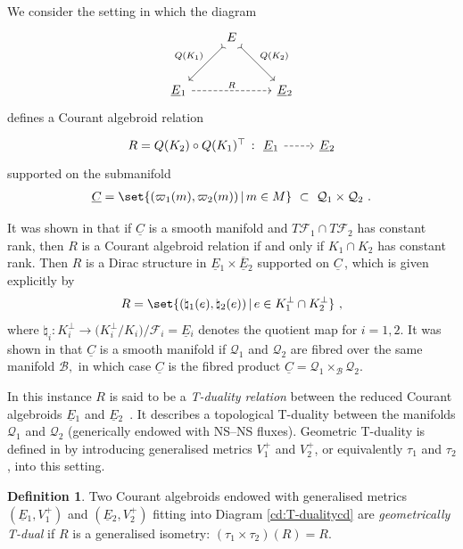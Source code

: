 \documentclass[a4paper, reqno, 11pt]{amsart}
\numberwithin{equation}{section}
\theoremstyle{definition}
\newtheorem{definition}[equation]{Definition}
\newcommand{\red}[1]{\underline{#1}}
\newcommand{\cB}{{\mathcal B}}
\newcommand{\cQ}{{\mathcal Q}}
\newcommand{\cF}{{\mathcal F}}
\theoremstyle{remark}
\begin{document}
We consider the setting in which the diagram
\begin{equation}
\begin{tikzcd}[row sep = 1cm] \label{cd:T-dualitycd}
  &\arrow[tail,swap]{dl}{Q(K_1)} E \arrow[tail]{dr}{Q(K_2)}&   \\
\red E{}_1 \arrow[dashed]{rr}{R}& & \red E{}_2 
 \end{tikzcd}
 \end{equation}
defines a  Courant algebroid relation 
\begin{equation}
\begin{tikzcd}
 R =  Q(K_2) \circ Q(K_1)^\top \ \colon \ \red E{}_1 \ar[r,dashed] & \red E{}_2 
 \end{tikzcd}
\end{equation} 
supported on the submanifold 
\begin{align}
    {\red C}=\set{(\varpi_1(m),\varpi_2(m)) \, | \, m \in M} \ \subset \ \cQ_1 \times \cQ_2 \ .
\end{align}

It was shown in \cite[Theorem 5.8]{DeFraja:2023fhe} that if $\red C$ is a smooth manifold and $T\cF_1 \cap T\cF_2$ has constant rank, then $R$ is a Courant algebroid relation if and only if $K_1 \cap K_2$ has constant rank. Then $R$ is a Dirac structure  in $\red E{}_1 \times \overline{\red E}{}_2$ supported on $\red C\,$, which is given explicitly by
\begin{align}\label{eqn:T-dualRelation}
    R = \set{(\natural_{1}(e), \natural_{2}(e))\,|\, e \in K_1^\perp \cap K_2^\perp} \ ,
\end{align}
where $\natural_i \colon  K_i^\perp \to \bigr( K_i^\perp /K_i \bigl) / \cF_i = \red E{}_i$ denotes the quotient map  for $i=1,2$.
It was shown in \cite[Lemma~5.7]{DeFraja:2023fhe}  that $\red C$ is a smooth manifold if $\cQ_1$ and $\cQ_2$ are fibred over the same manifold $\cB,$ in which case $\red C$ is the fibred product $\red C = \cQ_1 \times_\cB \cQ_2.$

In this instance $R$ is said to be a \emph{T-duality relation} between the reduced Courant algebroids $\red E{}_1$ and $\red E{}_2$~\cite{DeFraja:2023fhe}. It describes a topological T-duality between the manifolds $\cQ_1$ and $\cQ_2$ (generically endowed with NS--NS fluxes). Geometric T-duality is defined in \cite{DeFraja:2023fhe} by introducing generalised metrics $ V_1^+$ and $ V_2^+$, or equivalently $\tau_1$ and $\tau_2$, into this setting.

\begin{definition} \label{def:geomTdual}
Two Courant algebroids endowed with generalised metrics $(\red E{}_1,  V_1^+)$ and $(\red E{}_2,  V_2^+)$ fitting into Diagram \eqref{cd:T-dualitycd} are \emph{geometrically T-dual} if $R$ is a generalised isometry: $(\tau_1 \times \tau_2)(R) = R$.
\end{definition}
\end{document}
